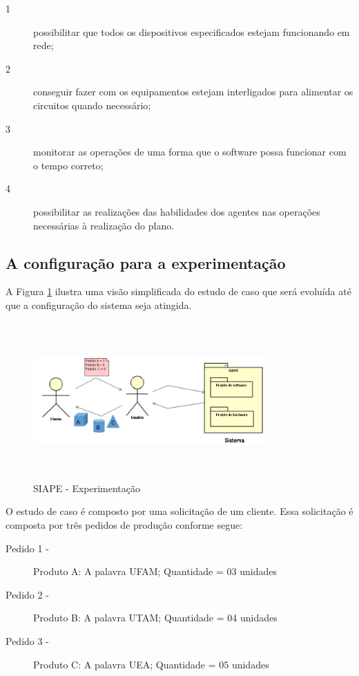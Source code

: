 \documentclass[10pt,letterpaper,twocolumn]{IEEEtran}
\begin{document}
\begin{description}
	\item [1]possibilitar que todos os dispositivos especificados estejam  funcionando em  rede;
	\item [2]conseguir fazer com os equipamentos estejam interligados para alimentar os circuitos quando necessário;
	\item [3]monitorar as operações de uma forma que o software possa funcionar com o tempo correto;
	\item [4]possibilitar as realizações das habilidades dos agentes  nas operações necessárias à realização do plano.
\end{description}

\subsection{A configuração para a experimentação}

A Figura \ref{F103} ilustra uma visão simplificada  do estudo de caso que será evoluída até que a configuração 
do sistema seja atingida.

\begin{figure}[h]
	\centering
	\includegraphics[width=8.9cm, height=6cm]{MeDSE_imagens/F103_SIAPE_ESTUDO_DE_CASO.jpg} 
	\caption{SIAPE - Experimentação}
	\label{F103}
\end{figure}

O estudo de caso é composto por uma solicitação de um cliente. Essa solicitação é composta por três 
pedidos de produção conforme segue:

\begin{description}
	\item[Pedido 1 -] Produto A: A  palavra UFAM; Quantidade = 03 unidades
	\item[Pedido 2 -] Produto  B: A  palavra UTAM; Quantidade = 04 unidades
	\item[Pedido 3 -] Produto  C: A palavra UEA; Quantidade = 05 unidades
\end{description} 
\end{document}
